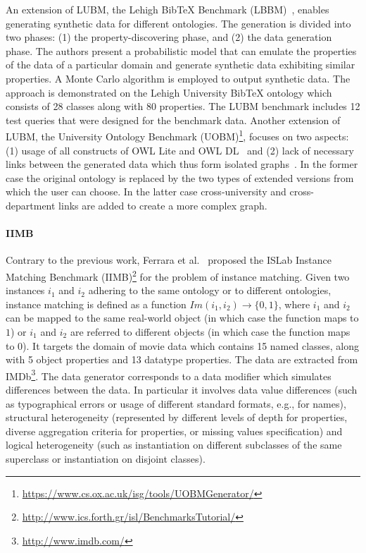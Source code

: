 An extension of LUBM, the Lehigh BibTeX Benchmark (LBBM)~\cite{Wang2005}, enables generating synthetic data for different ontologies. The generation is divided into two phases: (1) the property-discovering phase, and (2) the data generation phase. The authors present a probabilistic model that can emulate the properties of the data of a particular domain and generate synthetic data exhibiting similar properties. A Monte Carlo algorithm is employed to output synthetic data. The approach is demonstrated on the Lehigh University BibTeX ontology which consists of 28 classes along with 80 properties. The LUBM benchmark includes 12 test queries that were designed for the benchmark data. Another extension of LUBM, the University Ontology Benchmark (UOBM)\footnote{\url{https://www.cs.ox.ac.uk/isg/tools/UOBMGenerator/}}, focuses on two aspects: (1) usage of all constructs of OWL Lite and OWL DL~\cite{owl} and (2) lack of necessary links between the generated data which thus form isolated graphs~\cite{Ma:2006:TCO:2094613.2094629}. In the former case the original ontology is replaced by the two types of extended versions from which the user can choose. In the latter case cross-university and cross-department links are added to create a more complex graph.

\paragraph{IIMB} Contrary to the previous work, Ferrara et al.~\cite{Ferrara08OM} proposed the ISLab Instance Matching Benchmark (IIMB)\footnote{\url{http://www.ics.forth.gr/isl/BenchmarksTutorial/}} for the problem of instance matching. Given two instances $i_1$ and $i_2$ adhering to the same ontology or to different ontologies, instance matching is defined as a function $Im(i_1, i_2) \rightarrow \{0, 1\}$,  where $i_1$ and $i_2$ can be mapped to the same real-world object (in which case the function maps to $1$) or $i_1$ and $i_2$ are referred to different objects (in which case the function maps to $0$). It targets the domain of movie data which contains 15 named classes, along with 5 object properties and 13 datatype properties. The data are extracted from IMDb\footnote{\url{http://www.imdb.com/}}. The data generator corresponds to a data modifier which simulates differences between the data. In particular it involves data value differences (such as typographical errors or usage of different standard formats, e.g., for names), structural heterogeneity (represented by different levels of depth for properties, diverse aggregation criteria for properties, or missing values specification) and logical heterogeneity (such as instantiation on different subclasses of the same superclass or instantiation on disjoint classes).


